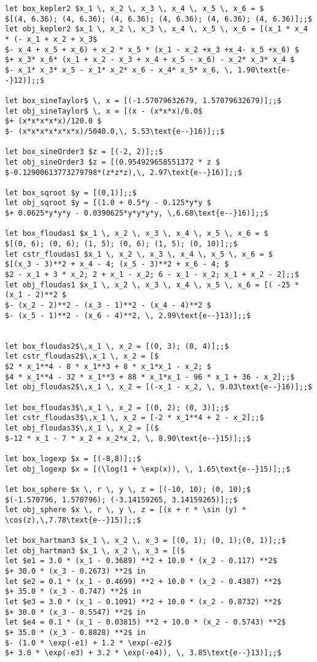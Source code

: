 {\begin{lstlisting}
let box_kepler2 $x_1 \, x_2 \, x_3 \, x_4 \, x_5 \, x_6 = $
$[(4, 6.36); (4, 6.36); (4, 6.36); (4, 6.36); (4, 6.36); (4, 6.36)];;$
let obj_kepler2 $x_1 \, x_2 \, x_3 \, x_4 \, x_5 \, x_6 = [(x_1 * x_4 * (- x_1 + x_2 + x_3$
$- x_4 + x_5 + x_6) + x_2 * x_5 * (x_1 - x_2 +x_3 +x_4- x_5 +x_6) $
$+ x_3* x_6* (x_1 + x_2 - x_3 + x_4 + x_5 - x_6) - x_2* x_3* x_4 $
$- x_1* x_3* x_5 - x_1* x_2* x_6 - x_4* x_5* x_6, \, 1.90\text{e--}12)];;$

let box_sineTaylor$ \, x = [(-1.57079632679, 1.57079632679)];;$
let obj_sineTaylor$ \, x = [(x - (x*x*x)/6.0$
$+ (x*x*x*x*x)/120.0 $
$- (x*x*x*x*x*x*x)/5040.0,\, 5.53\text{e--}16)];;$

let box_sineOrder3 $z = [(-2, 2)];;$
let obj_sineOrder3 $z = [(0.954929658551372 * z $
$-0.12900613773279798*(z*z*z),\, 2.97\text{e--}16)];;$

let box_sqroot $y = [(0,1)];;$
let obj_sqroot $y = [(1.0 + 0.5*y - 0.125*y*y $
$+ 0.0625*y*y*y - 0.0390625*y*y*y*y, \,6.68\text{e--}16)];;$

let box_floudas1 $x_1 \, x_2 \, x_3 \, x_4 \, x_5 \, x_6 = $
$[(0, 6); (0, 6); (1, 5); (0, 6); (1, 5); (0, 10)];;$
let cstr_floudas1 $x_1 \, x_2 \, x_3 \, x_4 \, x_5 \, x_6 = $
$[(x_3 - 3)**2 + x_4 - 4; (x_5 - 3)**2 + x_6 - 4; $
$2 - x_1 + 3 * x_2; 2 + x_1 - x_2; 6 - x_1 - x_2; x_1 + x_2 - 2];;$
let obj_floudas1 $x_1 \, x_2 \, x_3 \, x_4 \, x_5 \, x_6 = [( -25 * (x_1 - 2)**2 $
$- (x_2 - 2)**2 - (x_3 - 1)**2 - (x_4 - 4)**2 $
$- (x_5 - 1)**2 - (x_6 - 4)**2, \, 2.99\text{e--}13)];;$


let box_floudas2$\,x_1 \, x_2 = [(0, 3); (0, 4)];;$
let cstr_floudas2$\,x_1 \, x_2 = [$
$2 * x_1**4 - 8 * x_1**3 + 8 * x_1*x_1 - x_2; $
$4 * x_1**4 - 32 * x_1**3 + 88 * x_1*x_1 - 96 * x_1 + 36 - x_2];;$
let obj_floudas2$\,x_1 \, x_2 = [(-x_1 - x_2, \, 9.03\text{e--}16)];;$

let box_floudas3$\,x_1 \, x_2 = [(0, 2); (0, 3)];;$
let cstr_floudas3$\,x_1 \, x_2 = [-2 * x_1**4 + 2 - x_2];;$
let obj_floudas3$\,x_1 \, x_2 = [($
$-12 * x_1 - 7 * x_2 + x_2*x_2, \, 8.90\text{e--}15)];;$

let box_logexp $x = [(-8,8)];;$
let obj_logexp $x = [(\log(1 + \exp(x)), \, 1.65\text{e--}15)];;$

let box_sphere $x \, r \, y \, z = [(-10, 10); (0, 10);$
$(-1.570796, 1.570796); (-3.14159265, 3.14159265)];;$
let obj_sphere $x \, r \, y \, z = [(x + r * \sin (y) * \cos(z),\,7.78\text{e--}15)];;$

let box_hartman3 $x_1 \, x_2 \, x_3 = [(0, 1); (0, 1);(0, 1)];;$
let obj_hartman3 $x_1 \, x_2 \, x_3 = [($
let $e1 = 3.0 * (x_1 - 0.3689) **2 + 10.0 * (x_2 - 0.117) **2$
$+ 30.0 * (x_3 - 0.2673) **2$ in
let $e2 = 0.1 * (x_1 - 0.4699) **2 + 10.0 * (x_2 - 0.4387) **2$
$+ 35.0 * (x_3 - 0.747) **2$ in
let $e3 = 3.0 * (x_1 - 0.1091) **2 + 10.0 * (x_2 - 0.8732) **2$
$+ 30.0 * (x_3 - 0.5547) **2$ in
let $e4 = 0.1 * (x_1 - 0.03815) **2 + 10.0 * (x_2 - 0.5743) **2$
$+ 35.0 * (x_3 - 0.8828) **2$ in
$- (1.0 * \exp(-e1) + 1.2 * \exp(-e2)$
$+ 3.0 * \exp(-e3) + 3.2 * \exp(-e4)), \, 3.85\text{e--}13)];;$


\end{lstlisting}}
